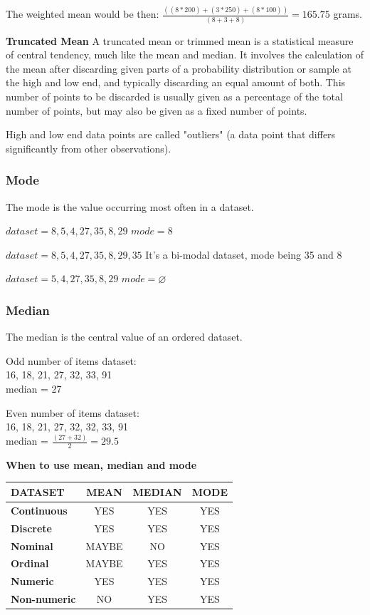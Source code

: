 \documentclass{article}
\begin{document}
The weighted mean would be then: $\frac{((8*200)+(3*250)+(8*100))}{(8+3+8)} = 165.75$ grams.  

\textbf{Truncated Mean}
A truncated mean or trimmed mean is a statistical measure of central tendency, much like the mean and median. It involves the calculation of the mean after discarding given parts of a probability distribution or sample at the high and low end, and typically discarding an equal amount of both. 
This number of points to be discarded is usually given as a percentage of the total number of points, but may also be given as a fixed number of points.

High and low end data points are called "outliers" (a data point that differs significantly from other observations).

\subsubsection{Mode}
The mode is the value occurring most often in a dataset.

$dataset = 8, 5, 4, 27, 35, 8, 29$
$mode = 8$

$dataset = 8, 5, 4, 27, 35, 8, 29, 35$
It’s a bi-modal dataset, mode being 35 and 8

$dataset =  5, 4, 27, 35, 8, 29$
$mode = \varnothing $

\subsubsection{Median}
The median is the central value of an ordered dataset.

Odd number of items dataset:\\
16, 18, 21, 27, 32, 33, 91\\
median = 27

Even number of items dataset:\\
16, 18, 21, 27, 32, 32, 33, 91\\
median = $\frac{(27 + 32)}{2} = 29.5$ 

\textbf{When to use mean, median and mode}

\begin{center}
\begin{tabular}{|l|c|c|c|}
\hline
DATASET & MEAN & MEDIAN & MODE \\ \hline
\textbf{Continuous} & YES & YES & YES \\ 
\textbf{Discrete} & YES & YES & YES \\ 
\textbf{Nominal} & MAYBE & NO & YES \\
\textbf{Ordinal} & MAYBE & YES & YES \\
\textbf{Numeric} & YES & YES & YES \\
\textbf{Non-numeric} & NO & YES & YES \\ 
\hline
\end{tabular}
\end{center}
\end{document}
